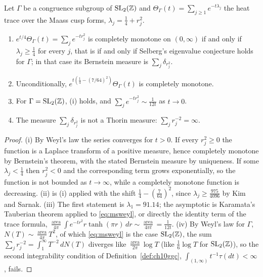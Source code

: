 \begin{theorem}\label{thm:mscm}
Let $\Gamma$ be a congruence subgroup of $\mathrm{SL}_2(\mathbb{Z})$ and $\Theta_\Gamma(t)=\sum_{j\ge1}e^{-t\lambda_j}$ the heat trace over the Maass cusp forms, $\lambda_j=\frac14+r_j^2$.
\begin{enumerate}
\item[(i)] $e^{t/4}\Theta_\Gamma(t)=\sum_je^{-tr_j^2}$ is completely monotone on $(0,\infty)$ if and only if $\lambda_j\ge\frac14$ for every $j$, that is if and only if Selberg's eigenvalue conjecture holds for $\Gamma$; in that case its Bernstein measure is $\sum_j\delta_{r_j^2}$.
\item[(ii)] Unconditionally, $e^{t(\frac14-(7/64)^2)}\Theta_\Gamma(t)$ is completely monotone.
\item[(iii)] For $\Gamma=\mathrm{SL}_2(\mathbb{Z})$, (i) holds, and $\sum_je^{-tr_j^2}\sim\frac1{12t}$ as $t\to0$.
\item[(iv)] The measure $\sum_j\delta_{r_j^2}$ is not a Thorin measure: $\sum_jr_j^{-2}=\infty$.
\end{enumerate}
\end{theorem}

\begin{proof}
(i) By Weyl's law the series converges for $t>0$. If every $r_j^2\ge0$ the function is a Laplace transform of a positive measure, hence completely monotone by Bernstein's theorem, with the stated Bernstein measure by uniqueness. If some $\lambda_j<\frac14$ then $r_j^2<0$ and the corresponding term grows exponentially, so the function is not bounded as $t\to\infty$, while a completely monotone function is decreasing. (ii) is (i) applied with the shift $\frac14-(\frac7{64})^2$, since $\lambda_j\ge\frac{975}{4096}$ by Kim and Sarnak. (iii) The first statement is $\lambda_1=91.14$; the asymptotic is Karamata's Tauberian theorem applied to \eqref{eq:msweyl}, or directly the identity term of the trace formula, $\frac{\operatorname{area}}{4\pi}\int e^{-tr^2}r\tanh(\pi r)\,dr\sim\frac{\operatorname{area}}{4\pi t}=\frac1{12t}$. (iv) By Weyl's law for $\Gamma$, $N(T)\sim\frac{\operatorname{area}}{4\pi}T^2$, of which \eqref{eq:msweyl} is the case $\mathrm{SL}_2(\mathbb{Z})$, the sum $\sum_jr_j^{-2}=\int_1^\infty T^{-2}\,dN(T)$ diverges like $\frac{\operatorname{area}}{2\pi}\log T$ (like $\frac16\log T$ for $\mathrm{SL}_2(\mathbb{Z})$), so the second integrability condition of Definition~\ref{def:ch10ggc}, $\int_{(1,\infty)}t^{-1}\tau(dt)<\infty$, fails.
\end{proof}

